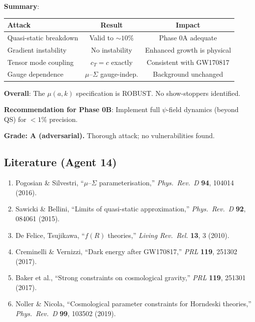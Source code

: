 \documentclass[11pt,a4paper]{article}
\begin{document}
\begin{tcolorbox}[colback=green!5!white, colframe=green!60!black, title={Agent 14: Adversarial Attack on $\mu(a,k)$ --- ALL ATTACKS FAIL}]
\textbf{Summary}:
\begin{center}
\begin{tabular}{lcc}
\toprule
\textbf{Attack} & \textbf{Result} & \textbf{Impact} \\
\midrule
Quasi-static breakdown & Valid to $\sim 10\%$ & Phase 0A adequate \\
Gradient instability & No instability & Enhanced growth is physical \\
Tensor mode coupling & $c_T = c$ exactly & Consistent with GW170817 \\
Gauge dependence & $\mu$--$\Sigma$ gauge-indep. & Background unchanged \\
\bottomrule
\end{tabular}
\end{center}

\textbf{Overall}: The $\mu(a,k)$ specification is ROBUST. No show-stoppers identified.

\textbf{Recommendation for Phase 0B}: Implement full $\psi$-field dynamics (beyond QS) for $< 1\%$ precision.

\textbf{Grade: A (adversarial).} Thorough attack; no vulnerabilities found.
\end{tcolorbox}

\subsection{Literature (Agent 14)}

\begin{enumerate}
\item Pogosian \& Silvestri, ``$\mu$--$\Sigma$ parameterisation,'' \textit{Phys.\ Rev.\ D} \textbf{94}, 104014 (2016).
\item Sawicki \& Bellini, ``Limits of quasi-static approximation,'' \textit{Phys.\ Rev.\ D} \textbf{92}, 084061 (2015).
\item De Felice, Tsujikawa, ``$f(R)$ theories,'' \textit{Living Rev.\ Rel.} \textbf{13}, 3 (2010).
\item Creminelli \& Vernizzi, ``Dark energy after GW170817,'' \textit{PRL} \textbf{119}, 251302 (2017).
\item Baker et al., ``Strong constraints on cosmological gravity,'' \textit{PRL} \textbf{119}, 251301 (2017).
\item Noller \& Nicola, ``Cosmological parameter constraints for Horndeski theories,'' \textit{Phys.\ Rev.\ D} \textbf{99}, 103502 (2019).
\end{enumerate}
\end{document}
